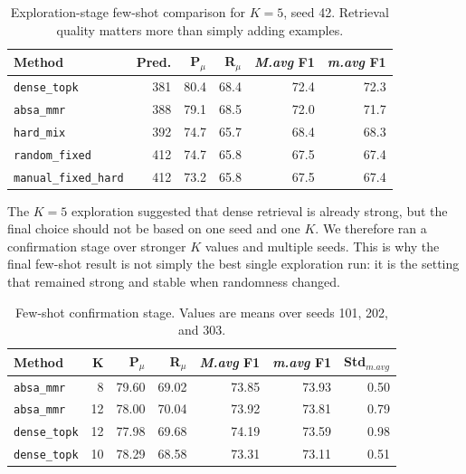 \documentclass[11pt,a4paper]{article}
\newcommand{\mavg}{\textit{m.avg}}
\newcommand{\Mavg}{\textit{M.avg}}
\newcommand{\code}[1]{\texttt{#1}}
\begin{document}
\begin{table}[H]
    \centering
    \small
    \setlength{\tabcolsep}{4pt}
    \caption{Exploration-stage few-shot comparison for $K=5$, seed 42. Retrieval quality matters more than simply adding examples.}
    \label{tab:fewshot_exploration}
    \begin{tabular}{@{}lrrrrr@{}}
        \toprule
        Method & Pred. & P$_\mu$ & R$_\mu$ & \Mavg{} F1 & \mavg{} F1 \\
        \midrule
        \code{dense\_topk} & 381 & 80.4 & 68.4 & 72.4 & 72.3 \\
        \code{absa\_mmr} & 388 & 79.1 & 68.5 & 72.0 & 71.7 \\
        \code{hard\_mix} & 392 & 74.7 & 65.7 & 68.4 & 68.3 \\
        \code{random\_fixed} & 412 & 74.7 & 65.8 & 67.5 & 67.4 \\
        \code{manual\_fixed\_hard} & 412 & 73.2 & 65.8 & 67.5 & 67.4 \\
        \bottomrule
    \end{tabular}
\end{table}

The $K=5$ exploration suggested that dense retrieval is already strong, but the final choice should not be based on one seed and one $K$. We therefore ran a confirmation stage over stronger $K$ values and multiple seeds. This is why the final few-shot result is not simply the best single exploration run: it is the setting that remained strong and stable when randomness changed.

\begin{table}[H]
    \centering
    \small
    \setlength{\tabcolsep}{4pt}
    \caption{Few-shot confirmation stage. Values are means over seeds 101, 202, and 303.}
    \label{tab:fewshot}
    \begin{tabular}{@{}lrrrrrr@{}}
        \toprule
        Method & K & P$_\mu$ & R$_\mu$ & \Mavg{} F1 & \mavg{} F1 & Std$_{\mavg}$ \\
        \midrule
        \code{absa\_mmr} & 8 & 79.60 & 69.02 & 73.85 & 73.93 & 0.50 \\
        \code{absa\_mmr} & 12 & 78.00 & 70.04 & 73.92 & 73.81 & 0.79 \\
        \code{dense\_topk} & 12 & 77.98 & 69.68 & 74.19 & 73.59 & 0.98 \\
        \code{dense\_topk} & 10 & 78.29 & 68.58 & 73.31 & 73.11 & 0.51 \\
        \bottomrule
    \end{tabular}
\end{table}
\end{document}
